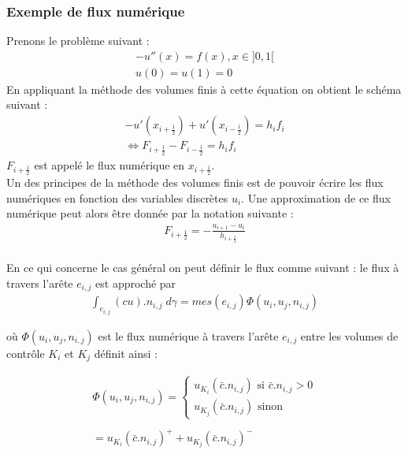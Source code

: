 \documentclass[12pt]{article}
\begin{document}
\subsubsection{Exemple de flux numérique}
\noindent Prenons le problème suivant :
\begin{eqnarray*}
        -u''(x)=f(x) ,  x\in]0,1[
        \\u(0)=u(1)=0
\end{eqnarray*}
En appliquant la méthode des volumes finis à cette équation on obtient le schéma suivant :
\begin{eqnarray*}
        -u'(x_{i+\frac{1}{2}})+u'(x_{i-\frac{1}{2}})=h_if_i
        \\\Leftrightarrow F_{i+\frac{1}{2}} -F_{i-\frac{1}{2}} = h_if_i
\end{eqnarray*}
$F_{i+\frac{1}{2}}$ est appelé le flux numérique en $x_{i+\frac{1}{2}}$.
\\
Un des principes de la méthode des volumes finis est de pouvoir écrire les flux numériques en fonction des variables discrètes $u_i$.
Une approximation de ce flux numérique peut alors être donnée par la notation suivante :
\\
\begin{eqnarray*}
        F_{i+\frac{1}{2}} = -\frac{u_{i+1}-u_i}{h_{i+\frac{1}{2}}}
\end{eqnarray*}
\\
En ce qui concerne le cas général on peut définir le flux comme suivant :
le flux à travers l'arête $e_{i,j}$ est approché par 
\begin{eqnarray*}
       \int_{e_{i,j}} (cu).{n_{i,j}} \; d\gamma=mes(e_{i,j})\Phi(u_i,u_j,n_{i,j})
\end{eqnarray*}

\noindent où $\Phi(u_i,u_j,n_{i,j})$ est le flux numérique à travers l'arête $e_{i,j}$ entre les volumes de contrôle $K_i$ et $K_j$ définit ainsi :

\begin{eqnarray*}
       \Phi(u_i,u_j,n_{i,j})=
        \left\{ 
        \begin{array}{llll}
            u_{K_i}(\bar c.n_{i,j}) \text{ si }\bar c.n_{i,j}> 0 
            \\u_{K_j}(\bar c.n_{i,j}) \text{ sinon}
        \end{array}
    \right .
    \\
    \\
    = u_{K_i}(\bar c.n_{i,j})^+ + u_{K_j}(\bar c.n_{i,j})^-
\end{eqnarray*}
\end{document}
